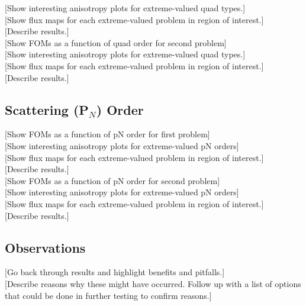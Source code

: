 [Show interesting anisotropy plots for extreme-valued quad types.] \\

[Show flux maps for each extreme-valued problem in region of interest.] \\

[Describe results.] \\

[Show FOMs as a function of quad order for second problem] \\

[Show interesting anisotropy plots for extreme-valued quad types.] \\

[Show flux maps for each extreme-valued problem in region of interest.] \\

[Describe results.] \\

\subsection{Scattering (P$_N$) Order}
\label{subsec:pnorder}
[Show FOMs as a function of pN order for first problem] \\

[Show interesting anisotropy plots for extreme-valued pN orders] \\

[Show flux maps for each extreme-valued problem in region of interest.] \\

[Describe results.] \\

[Show FOMs as a function of pN order for second problem] \\

[Show interesting anisotropy plots for extreme-valued pN orders] \\

[Show flux maps for each extreme-valued problem in region of interest.] \\

[Describe results.] \\

\subsection{Observations}
\label{subsec:observations}

[Go back through results and highlight benefits and pitfalls.] \\

[Describe reasons why these might have occurred. Follow up with a list of options
that could be done in further testing to confirm reasons.] \\
